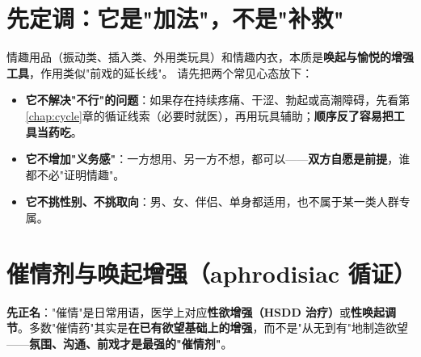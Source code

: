 \documentclass[12pt,UTF8,openany]{ctexbook}
\begin{document}
\section{先定调：它是"加法"，不是"补救"}
情趣用品（振动类、插入类、外用类玩具）和情趣内衣，本质是\textbf{唤起与愉悦的增强工具}，作用类似"前戏的延长线"。
请先把两个常见心态放下：
\begin{itemize}[leftmargin=2em,itemsep=0.3em]
  \item \textbf{它不解决"不行"的问题}：如果存在持续疼痛、干涩、勃起或高潮障碍，先看第\ref{chap:cycle}章的循证线索（必要时就医），再用玩具辅助；\textbf{顺序反了容易把工具当药吃}。
  \item \textbf{它不增加"义务感"}：一方想用、另一方不想，都可以——\textbf{双方自愿是前提}，谁都不必"证明情趣"。
  \item \textbf{它不挑性别、不挑取向}：男、女、伴侣、单身都适用，也不属于某一类人群专属。
\end{itemize}

\section{催情剂与唤起增强（aphrodisiac 循证）}

\noindent\textbf{先正名}："催情"是日常用语，医学上对应\textbf{性欲增强（HSDD 治疗）}或\textbf{性唤起调节}。多数"催情药"其实是\textbf{在已有欲望基础上的增强}，而不是"从无到有"地制造欲望——\textbf{氛围、沟通、前戏才是最强的"催情剂"}。
\end{document}
